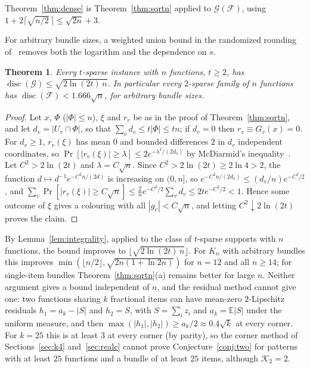 \documentclass[11pt,letterpaper]{article}
\newtheorem{theorem}{Theorem}[section]
\theoremstyle{definition}
\newcommand{\E}{\mathbb{E}}
\newcommand{\cF}{\mathcal{F}}
\newcommand{\cG}{\mathcal{G}}
\DeclareMathOperator{\disc}{disc}
\begin{document}
Theorem~\ref{thm:dense} is Theorem~\ref{thm:sqrtn} applied to $\cG(\cF)$, using
$1+2\lceil\sqrt{n/2}\,\rceil\le\sqrt{2n}+3$.

For arbitrary bundle sizes, a weighted union bound in the randomized rounding of~\cite{HMMS25}
removes both the logarithm and the dependence on $s$.

\begin{theorem}\label{thm:sqrtnew}
Every $t$-sparse instance with $n$ functions, $t\ge2$, has $\disc(\cG)\le\sqrt{2\ln(2t)\,n}$. In
particular every $2$-sparse family of $n$ functions has $\disc(\cF)<1.666\sqrt n$, for arbitrary bundle
sizes.
\end{theorem}

\begin{proof}
Let $x$, $\Phi$ ($|\Phi|\le n$), $\xi$ and $r_v$ be as in the proof of Theorem~\ref{thm:sqrtn}, and let
$d_v=|U_v\cap\Phi|$, so that $\sum_vd_v\le t|\Phi|\le tn$; if $d_v=0$ then $r_v\equiv G_v(x)=0$. For
$d_v\ge1$, $r_v(\xi)$ has mean $0$ and bounded differences $2$ in $d_v$ independent coordinates, so
$\Pr[|r_v(\xi)|\ge\lambda]\le2e^{-\lambda^2/(2d_v)}$ by McDiarmid's inequality~\cite{McD89}. Let
$C^2>2\ln(2t)$ and $\lambda=C\sqrt n$. Since $C^2>2\ln(2t)\ge2\ln4>2$, the function $d\mapsto d^{-1}e^{-C^2n/(2d)}$ is
increasing on $(0,n]$, so $e^{-C^2n/(2d_v)}\le(d_v/n)e^{-C^2/2}$, and
$\sum_v\Pr[|r_v(\xi)|\ge C\sqrt n]\le\frac2n e^{-C^2/2}\sum_vd_v\le2te^{-C^2/2}<1$. Hence some outcome
of $\xi$ gives a colouring with all $|g_v|<C\sqrt n$, and letting $C^2\downarrow2\ln(2t)$ proves the
claim.
\end{proof}

By Lemma~\ref{lem:integrality}, applied to the class of $t$-sparse supports with $n$ functions, the bound
improves to $\lfloor\sqrt{2\ln(2t)\,n}\rfloor$. For $K_n$ with arbitrary bundles this improves
$\min(\lfloor n/2\rfloor,\sqrt{2n(1+\ln2n)})$ for $n=12$ and all $n\ge14$; for single-item bundles
Theorem~\ref{thm:sqrtn}(a) remains better for large $n$. Neither
argument gives a bound independent of $n$, and the residual method cannot give one: two functions
sharing $k$ fractional items can have mean-zero $2$-Lipschitz residuals $h_1=a_k-|S|$ and $h_2=S$, with
$S=\sum_iz_i$ and $a_k=\E|S|$ under the uniform measure, and then $\max(|h_1|,|h_2|)\ge a_k/2\approx0.4\sqrt k$
at every corner. For $k=25$ this is at least $3$ at every corner (by parity), so the corner method of
Sections~\ref{sec:k4} and~\ref{sec:realc} cannot prove Conjecture~\ref{conj:two} for patterns with at
least $25$ functions and a bundle of at least $25$ items, although $\mathcal{K}_2=2$.
\end{document}
